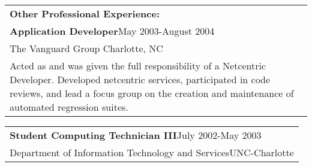 \documentclass[12pt]{report}
\def\fullLength{6.5in}
\begin{document}
\clearpage

\begin{table}[!ht]
\begin{tabular}{p{\fullLength}}
\textbf{\Large Other Professional Experience:}\\
\textbf{Application Developer}\hfill May 2003-August 2004\\
The Vanguard Group \hfill Charlotte, NC\\
Acted as and was given the full responsibility of a Netcentric Developer. Developed netcentric services, participated in code reviews, and lead a focus group on the creation and maintenance of automated regression suites.
\end{tabular}
\end{table}

\vspace{-5.0mm}

\begin{table}[!h]
\begin{tabular}{p{\fullLength}}
\textbf{Student Computing Technician III}\hfill July 2002-May 2003\\
Department of Information Technology and Services\hfill UNC-Charlotte\\
\end{tabular}
\end{table}

\vspace{-5.0mm}
\end{document}
